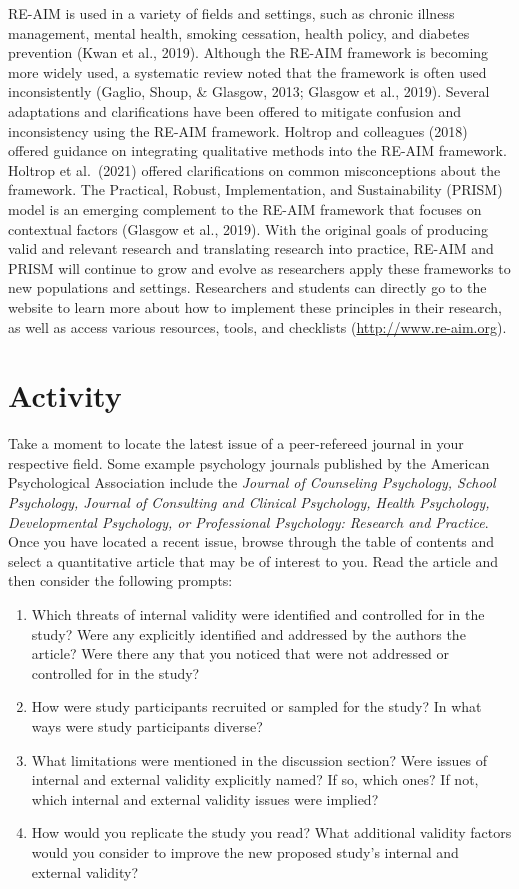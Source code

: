 \documentclass[
  11pt,
]{book}
\providecommand{\tightlist}{%
  \setlength{\itemsep}{0pt}\setlength{\parskip}{0pt}}
\begin{document}
RE-AIM is used in a variety of fields and settings, such as chronic illness management, mental health, smoking cessation, health policy, and diabetes prevention (Kwan et al., 2019). Although the RE-AIM framework is becoming more widely used, a systematic review noted that the framework is often used inconsistently (Gaglio, Shoup, \& Glasgow, 2013; Glasgow et al., 2019). Several adaptations and clarifications have been offered to mitigate confusion and inconsistency using the RE-AIM framework. Holtrop and colleagues (2018) offered guidance on integrating qualitative methods into the RE-AIM framework. Holtrop et al.~(2021) offered clarifications on common misconceptions about the framework. The Practical, Robust, Implementation, and Sustainability (PRISM) model is an emerging complement to the RE-AIM framework that focuses on contextual factors (Glasgow et al., 2019). With the original goals of producing valid and relevant research and translating research into practice, RE-AIM and PRISM will continue to grow and evolve as researchers apply these frameworks to new populations and settings. Researchers and students can directly go to the website to learn more about how to implement these principles in their research, as well as access various resources, tools, and checklists (\url{http://www.re-aim.org}).

\hypertarget{activity}{%
\section{Activity}\label{activity}}

Take a moment to locate the latest issue of a peer-refereed journal in your respective field. Some example psychology journals published by the American Psychological Association include the \emph{Journal of Counseling Psychology, School Psychology, Journal of Consulting and Clinical Psychology, Health Psychology, Developmental Psychology, or Professional Psychology: Research and Practice}. Once you have located a recent issue, browse through the table of contents and select a quantitative article that may be of interest to you. Read the article and then consider the following prompts:

\begin{enumerate}
\def\labelenumi{\arabic{enumi}.}
\tightlist
\item
  Which threats of internal validity were identified and controlled for in the study? Were any explicitly identified and addressed by the authors the article? Were there any that you noticed that were not addressed or controlled for in the study?
\item
  How were study participants recruited or sampled for the study? In what ways were study participants diverse?
\item
  What limitations were mentioned in the discussion section? Were issues of internal and external validity explicitly named? If so, which ones? If not, which internal and external validity issues were implied?
\item
  How would you replicate the study you read? What additional validity factors would you consider to improve the new proposed study's internal and external validity?
\end{enumerate}
\end{document}
